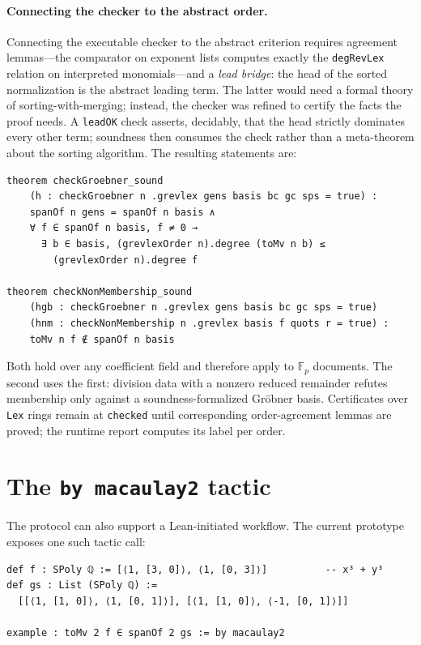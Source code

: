 \documentclass[11pt]{article}
\newcommand{\checked}{\textcolor{warnamber}{\code{checked}}}
\newcommand{\code}[1]{\texttt{#1}}
\begin{document}
\paragraph{Connecting the checker to the abstract order.}
Connecting the executable checker to the abstract criterion requires
agreement lemmas---the comparator on exponent lists
computes exactly the \code{degRevLex} relation on interpreted
monomials---and a \emph{lead bridge}: the head of the sorted
normalization is the abstract leading term.  The latter would need a
formal theory of sorting-with-merging; instead, the checker was
refined to certify the facts the proof needs.  A
\code{leadOK} check asserts, decidably, that the head strictly
dominates every other term; soundness then consumes the check rather
than a meta-theorem about the sorting algorithm.  The resulting
statements are:

\noindent\begin{minipage}{\linewidth}
\begin{lstlisting}[style=leanstyle]
theorem checkGroebner_sound
    (h : checkGroebner n .grevlex gens basis bc gc sps = true) :
    spanOf n gens = spanOf n basis ∧
    ∀ f ∈ spanOf n basis, f ≠ 0 →
      ∃ b ∈ basis, (grevlexOrder n).degree (toMv n b) ≤
        (grevlexOrder n).degree f

theorem checkNonMembership_sound
    (hgb : checkGroebner n .grevlex gens basis bc gc sps = true)
    (hnm : checkNonMembership n .grevlex basis f quots r = true) :
    toMv n f ∉ spanOf n basis
\end{lstlisting}
\end{minipage}

\noindent
Both hold over any coefficient field and therefore apply to
$\mathbb{F}_p$ documents.  The second uses the first: division data
with a nonzero reduced remainder refutes membership only against a
soundness-formalized Gr\"obner basis.  Certificates over \code{Lex}
rings remain at \checked{} until corresponding order-agreement lemmas
are proved; the runtime report computes its label per order.

\section{The \code{by macaulay2} tactic}\label{sec:tactic}

The protocol can also support a Lean-initiated workflow.  The current
prototype exposes one such tactic call:

\begin{lstlisting}[style=leanstyle]
def f : SPoly ℚ := [⟨1, [3, 0]⟩, ⟨1, [0, 3]⟩]          -- x³ + y³
def gs : List (SPoly ℚ) :=
  [[⟨1, [1, 0]⟩, ⟨1, [0, 1]⟩], [⟨1, [1, 0]⟩, ⟨-1, [0, 1]⟩]]

example : toMv 2 f ∈ spanOf 2 gs := by macaulay2
\end{lstlisting}
\end{document}
